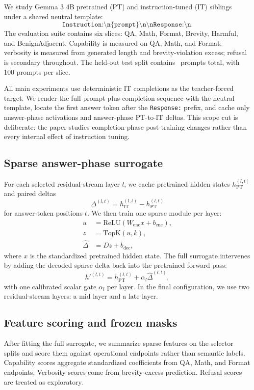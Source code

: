 \documentclass[11pt]{article}
\begin{document}
We study Gemma 3 4B pretrained (PT) and instruction-tuned (IT) siblings under a shared neutral template:
\[
\texttt{Instruction:\textbackslash n\{prompt\}\textbackslash n\textbackslash nResponse:\textbackslash n}.
\]
The evaluation suite contains six slices: QA, Math, Format, Brevity, Harmful, and BenignAdjacent. Capability is measured on QA, Math, and Format; verbosity is measured from generated length and brevity-violation excess; refusal is secondary throughout. The held-out test split contains \NumTestPrompts\ prompts total, with 100 prompts per slice.

All main experiments use deterministic IT completions as the teacher-forced target. We render the full prompt-plus-completion sequence with the neutral template, locate the first answer token after the \texttt{Response:} prefix, and cache only answer-phase activations and answer-phase PT-to-IT deltas. This scope cut is deliberate: the paper studies completion-phase post-training changes rather than every internal effect of instruction tuning.

\subsection{Sparse answer-phase surrogate}

For each selected residual-stream layer $l$, we cache pretrained hidden states $h^{(l,t)}_{\mathrm{PT}}$ and paired deltas
\[
\Delta^{(l,t)} = h^{(l,t)}_{\mathrm{IT}} - h^{(l,t)}_{\mathrm{PT}}
\]
for answer-token positions $t$. We then train one sparse module per layer:
\begin{align}
u &= \mathrm{ReLU}(W_{\mathrm{enc}} x + b_{\mathrm{enc}}), \\
z &= \mathrm{TopK}(u, k), \\
\hat{\Delta} &= D z + b_{\mathrm{dec}},
\end{align}
where $x$ is the standardized pretrained hidden state. The full surrogate intervenes by adding the decoded sparse delta back into the pretrained forward pass:
\[
h'^{(l,t)} = h^{(l,t)}_{\mathrm{PT}} + \alpha_l \hat{\Delta}^{(l,t)},
\]
with one calibrated scalar gate $\alpha_l$ per layer. In the final configuration, we use two residual-stream layers: a mid layer and a late layer.

\subsection{Feature scoring and frozen masks}

After fitting the full surrogate, we summarize sparse features on the selector splits and score them against operational endpoints rather than semantic labels. Capability scores aggregate standardized coefficients from QA, Math, and Format endpoints. Verbosity scores come from brevity-excess prediction. Refusal scores are treated as exploratory.
\end{document}
